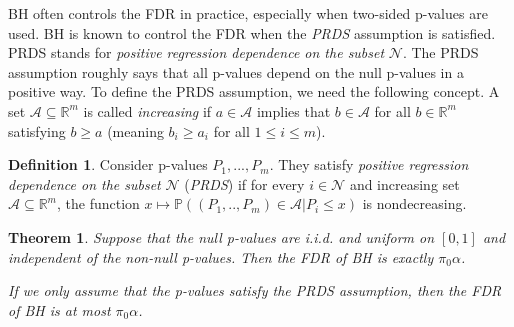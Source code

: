 \documentclass[11pt]{article}
\theoremstyle{plain}
\newtheorem{theorem}{Theorem}[section]
\theoremstyle{definition}
\newtheorem{definition}{Definition}[section]
\newcommand{\reals}{\mathbb{R}}
\newcommand{\N}{\mathcal{N}}
\newcommand{\A}{\mathcal{A}}
\newcommand{\pr}{\mathbb{P}}
\begin{document}
BH often controls the FDR in practice, especially when two-sided p-values are used.
BH is known to control the FDR  when the \emph{PRDS} assumption is satisfied.  PRDS stands for \emph{positive regression dependence on the subset} $\N$. The PRDS assumption roughly  says that all p-values depend on the null p-values in a positive way. 
To define the PRDS assumption, we need the following concept. A set $\A\subseteq\reals^m$ is called \emph{increasing} if $a\in \A$ implies that $b\in \A$ for all $b\in \reals^m$ satisfying $b\geq a$ (meaning $b_i\geq a_i$ for all $1\leq i \leq m$).

\begin{definition}
Consider p-values $P_1,...,P_m$. They satisfy \emph{positive regression dependence on the subset} $\N$ (\emph{PRDS}) if for every $i\in \N$ and increasing set $\A\subseteq \reals^m$, the function $x\mapsto \pr((P_1,..,P_m)\in \A|P_i\leq x)$ is nondecreasing.
\end{definition}

\begin{theorem}
Suppose that the null p-values are i.i.d. and uniform on $[0,1]$ and independent of the non-null p-values. Then the FDR of BH is exactly $\pi_0\alpha$.

 If we only assume that the p-values satisfy the PRDS assumption, then the FDR of BH is at most $\pi_0\alpha$.
\end{theorem}
\end{document}
